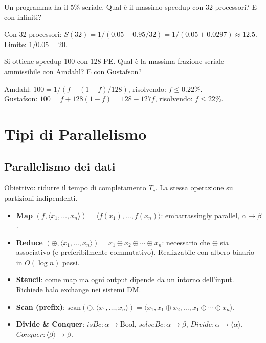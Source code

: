 \documentclass[11pt,a4paper]{article}
\theoremstyle{remark}
\newenvironment{esercizio}[1][]{%
  \begin{tcolorbox}[breakable,title={\textbf{Esercizio / Domanda d'esame}\ifx&#1&\else: #1\fi},
    colback=yellow!5!white, colframe=orange!75!black, fonttitle=\small\bfseries]%
}{%
  \end{tcolorbox}%
}
\newenvironment{risposta}{%
  \begin{tcolorbox}[breakable,title={\textbf{Risposta}},
    colback=green!5!white, colframe=green!50!black, fonttitle=\small\bfseries]%
}{%
  \end{tcolorbox}%
}
\begin{document}
\begin{esercizio}
Un programma ha il 5\% seriale. Qual è il massimo speedup con 32 processori? E con infiniti?
\end{esercizio}
\begin{risposta}
Con 32 processori: $S(32) = 1/(0.05 + 0.95/32) = 1/(0.05 + 0.0297) \approx 12.5$.
Limite: $1/0.05 = 20$.
\end{risposta}

\begin{esercizio}
Si ottiene speedup 100 con 128 PE. Qual è la massima frazione seriale ammissibile con Amdahl? E con Gustafson?
\end{esercizio}
\begin{risposta}
Amdahl: $100 = 1/(f + (1-f)/128)$, risolvendo: $f \leq 0.22\%$.\\
Gustafson: $100 = f + 128(1-f) = 128 - 127f$, risolvendo: $f \leq 22\%$.
\end{risposta}

\section{Tipi di Parallelismo}

\subsection{Parallelismo dei dati}

Obiettivo: ridurre il tempo di completamento $T_c$.
La stessa operazione su partizioni indipendenti.

\begin{itemize}
  \item \textbf{Map} $(f, \langle x_1,\ldots,x_n\rangle) = \langle f(x_1),\ldots,f(x_n)\rangle$: embarrassingly parallel, $\alpha \to \beta$.
  \item \textbf{Reduce} $({\oplus}, \langle x_1,\ldots,x_n\rangle) = x_1 \oplus x_2 \oplus \cdots \oplus x_n$: necessario che $\oplus$ sia associativo (e preferibilmente commutativo). Realizzabile con albero binario in $O(\log n)$ passi.
  \item \textbf{Stencil}: come map ma ogni output dipende da un intorno dell'input. Richiede halo exchange nei sistemi DM.
  \item \textbf{Scan (prefix)}: $\text{scan}({\oplus}, \langle x_1,\ldots,x_n\rangle) = \langle x_1, x_1\oplus x_2, \ldots, x_1\oplus\cdots\oplus x_n\rangle$.
  \item \textbf{Divide \& Conquer}: $isBc : \alpha \to \text{Bool}$, $solveBc : \alpha \to \beta$, $Divide : \alpha \to \langle\alpha\rangle$, $Conquer : \langle\beta\rangle \to \beta$.
\end{itemize}
\end{document}
